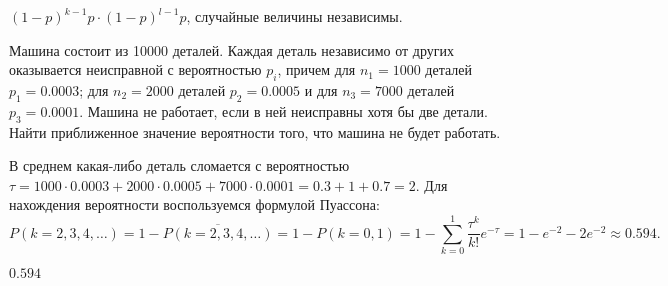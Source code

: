 \begin{result}
$ (1 - p)^{k - 1} p \cdot  (1 - p)^{l - 1} p $, случайные величины независимы.
\end{result}

\medskip
\begin{task}{20}
  Машина состоит из 10000 деталей. Каждая деталь независимо от других оказывается неисправной
  с вероятностью $p_i$, причем для $n_1 = 1000$ деталей $p_1 = 0.0003$; для $n_2 = 2000$ деталей 
  $p_2 = 0.0005$ и для $n_3 = 7000$ деталей $p_3 = 0.0001$. Машина не работает, если в ней
  неисправны хотя бы две детали. Найти приближенное значение вероятности того, что машина не будет работать.
\end{task}

\begin{solution}
В среднем какая-либо деталь сломается с вероятностью $\tau = 1000 \cdot 0.0003 + 2000 \cdot 0.0005 +
7000 \cdot  0.0001 = 0.3 + 1 + 0.7 = 2$. Для нахождения вероятности воспользуемся формулой Пуассона:
\[
P(k = 2, 3, 4, \dots) = 1 - \overline{P(k = 2, 3, 4, \dots)} = 1 - P(k = 0, 1) = 1 - 
\sum_{k=0}^{1} \frac{\tau^{k}}{k!} e^{-\tau} = 1 - e^{-2} - 2e^{-2} \approx 0.594 .\] 
\end{solution}

\begin{result}
$0.594$
\end{result}

